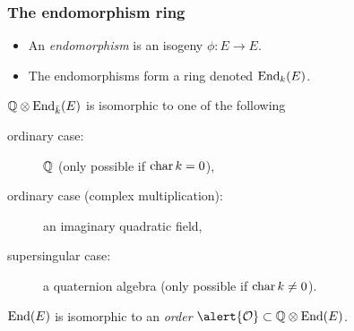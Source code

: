 \documentclass{beamer}
\begin{document}
\begin{frame}
  \frametitle{The endomorphism ring}
  
  \begin{itemize}
  \item An \emph{endomorphism} is an isogeny \emph{$\phi:E\to E$}.
  \item The endomorphisms form a ring denoted \emph{$\operatorname{End}_k(E)$}.
  \end{itemize}

  \begin{theorem}
    \alert{$\mathbb{Q}\otimes\operatorname{End}_{\bar{k}}(E)$} is isomorphic to one of the
    following
    \begin{description}
    \item[ordinary case:] \alert{$\mathbb{Q}$} (only possible if $\operatorname{char} k=0$),
    \item[ordinary case (complex multiplication):] an \alert{imaginary quadratic field},
    \item[supersingular case:] a \alert{quaternion algebra} (only possible if $\operatorname{char} k\ne0$).
    \end{description}
  \end{theorem}

  \begin{corollary}
    \alert{$\operatorname{End}(E)$} is isomorphic to an \textit{order} 
    $\alert{\O}\subset\Q\otimes\End(E)$.
  \end{corollary}
\end{frame}

\end{document}
